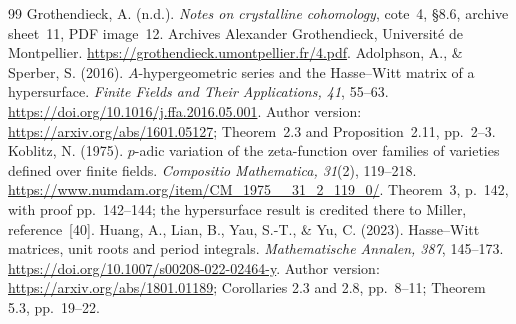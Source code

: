 \documentclass[11pt]{article}
\begin{document}
\begin{thebibliography}{99}
Grothendieck, A. (n.d.). \emph{Notes on crystalline cohomology}, cote~4, \S8.6, archive sheet~11, PDF image~12. Archives Alexander Grothendieck, Universit\'e de Montpellier. \url{https://grothendieck.umontpellier.fr/4.pdf}.
Adolphson, A., \& Sperber, S. (2016). $A$-hypergeometric series and the Hasse--Witt matrix of a hypersurface. \emph{Finite Fields and Their Applications, 41}, 55--63. \url{https://doi.org/10.1016/j.ffa.2016.05.001}. Author version: \url{https://arxiv.org/abs/1601.05127}; Theorem~2.3 and Proposition~2.11, pp.~2--3.
Koblitz, N. (1975). $p$-adic variation of the zeta-function over families of varieties defined over finite fields. \emph{Compositio Mathematica, 31}(2), 119--218. \url{https://www.numdam.org/item/CM_1975__31_2_119_0/}. Theorem~3, p.~142, with proof pp.~142--144; the hypersurface result is credited there to Miller, reference~[40].
Huang, A., Lian, B., Yau, S.-T., \& Yu, C. (2023).
Hasse--Witt matrices, unit roots and period integrals.
\emph{Mathematische Annalen, 387}, 145--173.
\url{https://doi.org/10.1007/s00208-022-02464-y}.
Author version: \url{https://arxiv.org/abs/1801.01189};
Corollaries 2.3 and 2.8, pp.\ 8--11; Theorem 5.3, pp.\ 19--22.


\end{thebibliography}
\end{document}
